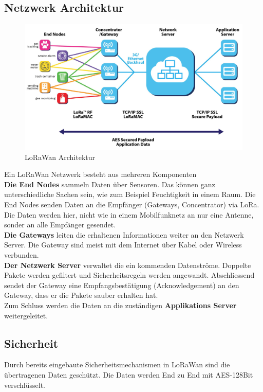 \documentclass[11pt,english,german]{report}
\theoremstyle{definition}
\begin{document}
\subsection{Netzwerk Architektur}
\begin{figure}[H]
	\centering
	\includegraphics[width=\textwidth]{img/lorawantopology.jpg}
	\caption[LoRaWan Architektur]
	{LoRaWan Architektur}
\end{figure}
Ein LoRaWan Netzwerk besteht aus mehreren Komponenten\\[0.3cm]
\textbf{Die End Nodes} sammeln Daten über Sensoren. Das können ganz unterschiedliche Sachen sein, wie zum Beispiel Feuchtigkeit in einem Raum. Die End Nodes senden Daten an die Empfänger (Gateways, Concentrator) via LoRa. Die Daten werden hier, nicht wie in einem Mobilfunknetz an nur eine Antenne, sonder an alle Empfänger gesendet.\\[0.3cm]
\textbf{Die Gateways} leiten die erhaltenen Informationen weiter an den Netzwerk Server. Die Gateway sind meist mit dem Internet über Kabel oder Wireless verbunden.\\[0.3cm]
\textbf{Der Netzwerk Server} verwaltet die ein kommenden Datenströme. Doppelte Pakete werden gefiltert und Sicherheitsregeln werden angewandt. Abschliessend sendet der Gateway eine Empfangsbestätigung (Acknowledgement) an den Gateway, dass er die Pakete sauber erhalten hat.\\[0.3cm]
Zum Schluss werden die Daten an die zuständigen \textbf{Applikations Server} weitergeleitet.

\newpage
\subsection{Sicherheit}
Durch bereits eingebaute Sicherheitsmechanismen in LoRaWan sind die übertragenen Daten geschützt. Die Daten werden End zu End mit AES-128Bit verschlüsselt.
\end{document}
